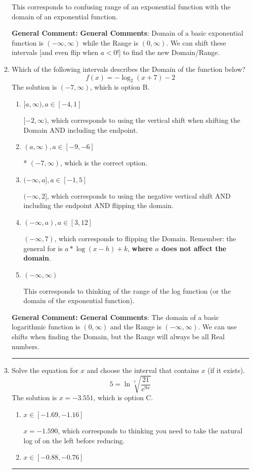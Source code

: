 \documentclass{extbook}[14pt]
\newcommand{\litem}[1]{\item #1

\rule{\textwidth}{0.4pt}}
\begin{document}
\begin{enumerate}
{\begin{enumerate}[label=\Alph*.]
This corresponds to confusing range of an exponential function with the domain of an exponential function.
\end{enumerate}

\textbf{General Comment:} \textbf{General Comments}: Domain of a basic exponential function is $(-\infty, \infty)$ while the Range is $(0, \infty)$. We can shift these intervals [and even flip when $a<0$!] to find the new Domain/Range.
}
\litem{
Which of the following intervals describes the Domain of the function below?
\[ f(x) = -\log_2{(x+7)}-2 \]
The solution is \( (-7, \infty) \), which is option B.\begin{enumerate}[label=\Alph*.]
\item \( [a, \infty), a \in [-4, 1] \)

$[-2, \infty)$, which corresponds to using the vertical shift when shifting the Domain AND including the endpoint.
\item \( (a, \infty), a \in [-9, -6] \)

* $(-7, \infty)$, which is the correct option.
\item \( (-\infty, a], a \in [-1, 5] \)

$(-\infty, 2]$, which corresponds to using the negative vertical shift AND including the endpoint AND flipping the domain.
\item \( (-\infty, a), a \in [3, 12] \)

$(-\infty, 7)$, which corresponds to flipping the Domain. Remember: the general for is $a*\log(x-h)+k$, \textbf{where $a$ does not affect the domain}.
\item \( (-\infty, \infty) \)

This corresponds to thinking of the range of the log function (or the domain of the exponential function).
\end{enumerate}

\textbf{General Comment:} \textbf{General Comments}: The domain of a basic logarithmic function is $(0, \infty)$ and the Range is $(-\infty, \infty)$. We can use shifts when finding the Domain, but the Range will always be all Real numbers.
}
\litem{
 Solve the equation for $x$ and choose the interval that contains $x$ (if it exists).
\[  5 = \ln{\sqrt[7]{\frac{21}{e^{9x}}}} \]
The solution is \( x = -3.551 \), which is option C.\begin{enumerate}[label=\Alph*.]
\item \( x \in [-1.69, -1.16] \)

$x = -1.590$, which corresponds to thinking you need to take the natural log of on the left before reducing.
\item \( x \in [-0.88, -0.76] \)


\end{enumerate}}
\end{enumerate}
\end{document}
